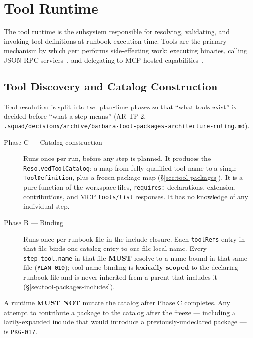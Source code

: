 \chapter{Tool Runtime}
\label{ch:tools}

The tool runtime is the subsystem responsible for resolving, validating, and
invoking tool definitions at runbook execution time.  Tools are the primary
mechanism by which gert performs side-effecting work: executing binaries,
calling JSON-RPC services~\cite{jsonrpc-spec}, and delegating to MCP-hosted capabilities~\cite{mcp-spec}.

\section{Tool Discovery and Catalog Construction}
\label{sec:tool-discovery}

Tool resolution is split into two plan-time phases so that ``what tools
exist'' is decided before ``what a step means'' (AR-TP-2,
\texttt{.squad/decisions/archive/barbara-tool-packages-architecture-ruling.md}).

\begin{description}
  \item[Phase C --- Catalog construction] Runs once per run, before any step
        is planned. It produces the \texttt{ResolvedToolCatalog}: a map from
        fully-qualified tool name to a single \texttt{ToolDefinition}, plus a
        frozen package map (\S\ref{sec:tool-packages}). It is a pure function
        of the workspace files, \texttt{requires:} declarations, extension
        contributions, and MCP \texttt{tools/list} responses. It has no
        knowledge of any individual step.
  \item[Phase B --- Binding] Runs once per runbook file in the include
        closure. Each \texttt{toolRefs} entry in that file binds one catalog
        entry to one file-local name. Every \texttt{step.tool.name} in that
        file \textbf{MUST} resolve to a name bound in that same file
        (\texttt{PLAN-010}); tool-name binding is \textbf{lexically scoped} to
        the declaring runbook file and is never inherited from a parent that
        includes it (\S\ref{sec:tool-packages-includes}).
\end{description}

A runtime \textbf{MUST NOT} mutate the catalog after Phase C completes. Any
attempt to contribute a package to the catalog after the freeze --- including
a lazily-expanded include that would introduce a previously-undeclared
package --- is \texttt{PKG-017}.

